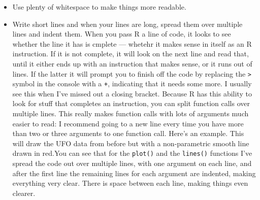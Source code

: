 \documentclass[
]{book}
\newenvironment{Shaded}{\begin{snugshade}}{\end{snugshade}}
\newcommand{\DataTypeTok}[1]{\textcolor[rgb]{0.13,0.29,0.53}{#1}}
\newcommand{\DecValTok}[1]{\textcolor[rgb]{0.00,0.00,0.81}{#1}}
\newcommand{\FloatTok}[1]{\textcolor[rgb]{0.00,0.00,0.81}{#1}}
\newcommand{\KeywordTok}[1]{\textcolor[rgb]{0.13,0.29,0.53}{\textbf{#1}}}
\newcommand{\NormalTok}[1]{#1}
\newcommand{\OperatorTok}[1]{\textcolor[rgb]{0.81,0.36,0.00}{\textbf{#1}}}
\newcommand{\StringTok}[1]{\textcolor[rgb]{0.31,0.60,0.02}{#1}}
\begin{document}
\begin{itemize}
\item
  Use plenty of whitespace to make things more readable.
\item
  Write short lines and when your lines are long, spread them over multiple lines and indent them. When you pass R a line of code, it looks to see whether the line it has is cmplete --- whetehr it makes sense in itself as an R instruction. If it is not complete, it will look on the next line and read that, until it either ends up with an instruction that makes sense, or it runs out of lines. If the latter it will prompt you to finish off the code by replacing the \texttt{\textgreater{}} symbol in the console with a \texttt{+}, indicating that it needs some more. I usually see this when I've missed out a closing bracket. Because R has this ability to look for stuff that completes an instruction, you can split function calls over multiple lines. This really makes function calls with lots of arguments much easier to read: I recommend going to a new line every time you have more than two or three arguments to one function call. Here's an example. This will draw the UFO data from before but with a non-parametric smooth line drawn in red.You can see that for the \texttt{plot()} and the \texttt{lines()} functions I've spread the code out over multiple lines, with one argument on each line, and after the first line the remaining lines for each argument are indented, making everything very clear. There is space between each line, making things even clearer.
\end{itemize}

\begin{Shaded}
\end{Shaded}
\end{document}
